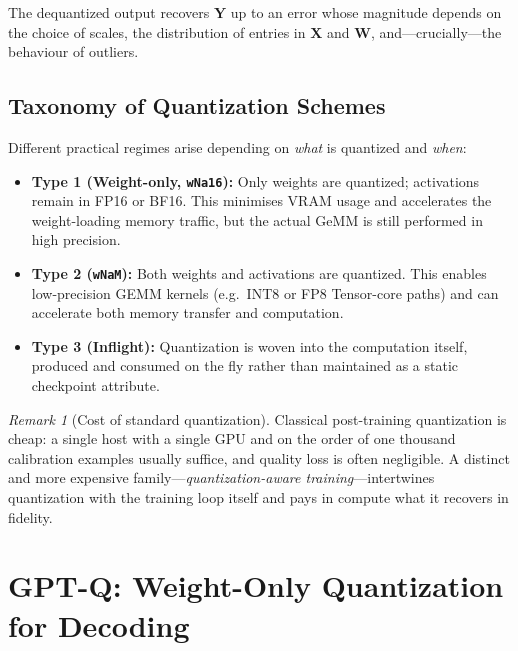 \documentclass[11pt,a4paper]{article}
\theoremstyle{definition}
\theoremstyle{remark}
\newtheorem*{remark}{Remark}
\theoremstyle{plain}
\begin{document}
The dequantized output recovers $\mathbf{Y}$ up to an error whose
magnitude depends on the choice of scales, the distribution of entries in
$\mathbf{X}$ and $\mathbf{W}$, and---crucially---the behaviour of
outliers.

\subsection{Taxonomy of Quantization Schemes}

Different practical regimes arise depending on \emph{what} is quantized
and \emph{when}:

\begin{itemize}[leftmargin=1.5em, itemsep=2pt]
  \item \textbf{Type 1 (Weight-only, \texttt{wNa16}):} Only weights are
        quantized; activations remain in FP16 or BF16. This minimises
        VRAM usage and accelerates the weight-loading memory traffic, but
        the actual GeMM is still performed in high precision.
  \item \textbf{Type 2 (\texttt{wNaM}):} Both weights and activations are
        quantized. This enables low-precision GEMM kernels (e.g.\ INT8 or
        FP8 Tensor-core paths) and can accelerate both memory transfer
        and computation.
  \item \textbf{Type 3 (Inflight):} Quantization is woven into the
        computation itself, produced and consumed on the fly rather than
        maintained as a static checkpoint attribute.
\end{itemize}

\begin{remark}[Cost of standard quantization]
Classical post-training quantization is cheap: a single host with a single
GPU and on the order of one thousand calibration examples usually
suffice, and quality loss is often negligible. A distinct and more
expensive family---\emph{quantization-aware training}---intertwines
quantization with the training loop itself and pays in compute what it
recovers in fidelity.
\end{remark}

\section{GPT-Q: Weight-Only Quantization for Decoding}
\label{sec:gptq}
\end{document}
